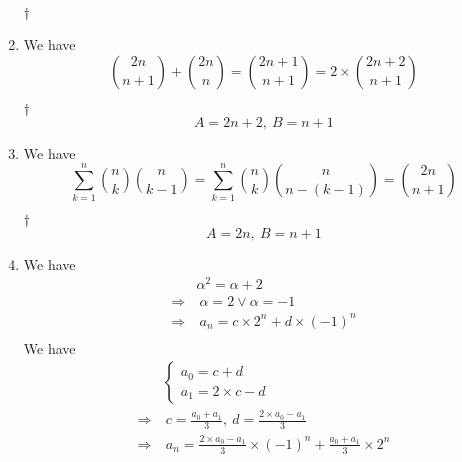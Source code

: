 \documentclass[a4paper,12pt]{article}
\begin{document}
\begin{enumerate}
\begin{answer}{$\dag$}
\begin{equation}
        \end{equation}
    \end{answer}
    \item We have \begin{equation}
        \binom{2n}{n + 1} + \binom{2n}{n} = \binom{2n + 1}{n + 1} = 2 \times \binom{2n + 2}{n + 1}
    \end{equation}
    \begin{answer}{$\dag$}\begin{equation}
            A = 2n + 2, \ B = n + 1
        \end{equation}
    \end{answer}
    \item We have \begin{equation}
        \sum_{k = 1}^{n}\binom{n}{k}\binom{n}{k - 1} = \sum_{k = 1}^{n}\binom{n}{k}\binom{n}{n - (k - 1)} = \binom{2n}{n + 1}
    \end{equation}
    \begin{answer}{$\dag$}\begin{equation}
            A = 2n, \ B = n + 1
        \end{equation}
    \end{answer}
    \item We have \begin{equation}
        \begin{aligned}
            & \alpha^2 = \alpha + 2 \\
            \Rightarrow & \ \alpha = 2 \lor \alpha = -1 \\
            \Rightarrow & \ a_n = c \times 2^n + d \times (-1)^n \\
        \end{aligned}
    \end{equation} We have \begin{equation}
        \begin{aligned}
            & \begin{cases}
                a_0 = c + d \\
                a_1 = 2 \times c - d
            \end{cases} \\
            \Rightarrow & \ c = \frac{a_0 + a_1}{3}, \ d = \frac{2 \times a_0 - a_1}{3} \\
            \Rightarrow & \ a_n = \frac{2 \times a_0 - a_1}{3} \times (-1)^n + \frac{a_0 + a_1}{3} \times 2^n 
        \end{aligned}
    \end{equation}

\end{enumerate}
\end{document}
